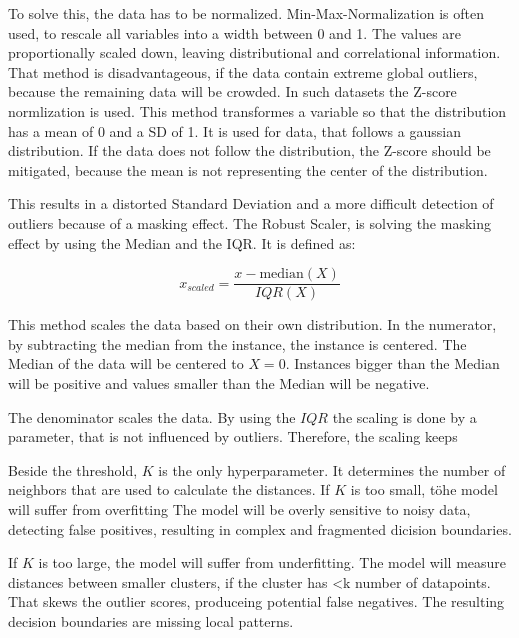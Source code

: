 To solve this, the data has to be normalized. 
Min-Max-Normalization is often used, to rescale all variables into a width between 0 and 1.
The values are proportionally scaled down, leaving distributional and correlational information.
That method is disadvantageous, if the data contain extreme global outliers, because the remaining data will be crowded.
In such datasets the Z-score normlization is used.
This method transformes a variable so that the distribution has a mean of 0 and a SD of 1. 
It is used for data, that follows a gaussian distribution.  
If the data does not follow the distribution, the Z-score should be mitigated, because the mean is not representing the center of the distribution.


This results in a distorted Standard Deviation and a more difficult detection of outliers because of a masking effect.
The Robust Scaler, is solving the masking effect by using the Median and the IQR.  
It is defined as:

\begin{equation}
    x_{scaled} = \frac{x - \text{median}(X)}{IQR(X)}
\end{equation}

This method scales the data based on their own distribution.
In the numerator, by subtracting the median from the instance, the instance is centered.
The Median of the data will be centered to $X=0$.
Instances bigger than the Median will be positive and values smaller than the Median will be negative.


The denominator scales the data.
By using the $IQR$ the scaling is done by a parameter, that is not influenced by outliers.
Therefore, the scaling keeps 


Beside the threshold, $K$ is the only hyperparameter.
It determines the number of neighbors that are used to calculate the distances.  
If $K$ is too small, töhe model will suffer from overfitting
The model will be overly sensitive to noisy data, detecting false positives, resulting in complex and fragmented dicision boundaries.


If $K$ is too large, the model will suffer from underfitting.
The model will measure distances between smaller clusters, if the cluster has <k number of datapoints. 
That skews the outlier scores, produceing potential false negatives. 
The resulting decision boundaries are missing local patterns.


